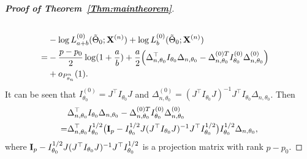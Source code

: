\documentclass[11pt]{article}
\theoremstyle{plain}
\theoremstyle{definition}
\theoremstyle{remark}
\begin{document}
\begin{appendices}
\begin{proof}[\textbf{Proof of Theorem~\ref{Thm:maintheorem}}]
$$\begin{aligned}
    \\
    &-
    \log L^{(0)}_{a+b}(\tilde{\Theta}_0;\mathbf{X}^{(n)})+
    \log L^{(0)}_b(\tilde{\Theta}_0;\mathbf{X}^{(n)})\\
    =&
    -\frac{p-p_0}{2}\log (1+\frac{a}{b})
    +
    \frac{a}{2}\Big(
    \Delta_{n,\theta_0}^\top  I_{\theta_0} \Delta_{n,\theta_0}
    -
    \Delta_{n,\theta_0}^{{(0)}T} I^{(0)}_{\theta_0} \Delta^{(0)}_{n,\theta_0}
    \Big)
    \\
    &+o_{P^n_{\theta_n}}(1).
\end{aligned}
$$
It can be seen that $I_{\theta_0}^{(0)}= J^\top  I_{\theta_0}J$ and $\Delta_{n,\theta_0}^{(0)}=(J^\top  I_{\theta_0}J)^{-1} J^\top  I_{\theta_0} \Delta_{n,\theta_0}$.
Then
\begin{equation*}
    \begin{split}
            &\Delta_{n,\theta_0}^\top  I_{\theta_0} \Delta_{n,\theta_0}
            -
            \Delta_{n,\theta_0}^{{(0)}T} I^{(0)}_{\theta_0} \Delta^{(0)}_{n,\theta_0}
            \\
            =&
            \Delta_{n,\theta_0}^\top  I_{\theta_0}^{1/2}\big(
            \mathbf{I}_p-
            I_{\theta_0}^{1/2} J (J^\top  I_{\theta_0} J)^{-1} J^\top  I_{\theta_0}^{1/2}
            \big)I_{\theta_0}^{1/2}\Delta_{n,\theta_0},
    \end{split}
\end{equation*}
where $
            \mathbf{I}_p-
            I_{\theta_0}^{1/2} J (J^\top  I_{\theta_0} J)^{-1} J^\top  I_{\theta_0}^{1/2}
$
is a projection matrix with rank $p-p_0$.


\end{proof}
\end{appendices}
\end{document}
